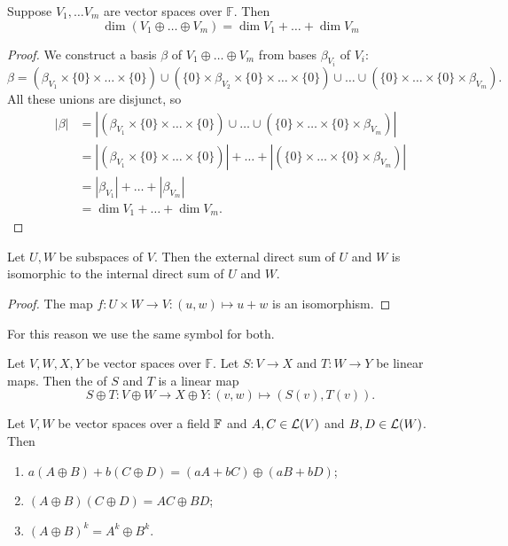 \begin{proposition}
Suppose $V_1, \ldots V_m$ are vector spaces over $\mathbb{F}$. Then
\[ \dim(V_1\oplus\ldots \oplus V_m) = \dim V_1 + \ldots + \dim V_m \]
\label{dimDirectSum}
\end{proposition}
\begin{proof}
We construct a basis $\beta$ of $V_1\oplus\ldots \oplus V_m$ from bases $\beta_{V_i}$ of $V_i$:
\[ \beta = (\beta_{V_1} \times \{0 \} \times \ldots \times \{0 \}) \cup (\{0 \} \times \beta_{V_2}\times \{0 \} \times \ldots \times \{0 \}) \cup \ldots \cup (\{0 \}\times \ldots \times \{0 \} \times \beta_{V_m}). \]
All these unions are disjunct, so
\begin{align*}
|\beta| &= |(\beta_{V_1} \times \{0 \} \times \ldots \times \{0 \}) \cup  \ldots \cup (\{0 \}\times \ldots \times \{0 \} \times \beta_{V_m})| \\
&= |(\beta_{V_1} \times \{0 \} \times \ldots \times \{0 \})| + \ldots + |(\{0 \}\times \ldots \times \{0 \} \times \beta_{V_m})| \\
&= | \beta_{V_1}| + \ldots + |\beta_{V_m}| \\
&= \dim V_1 + \ldots + \dim V_m.
\end{align*}
\end{proof}

\begin{proposition}
Let $U,W$ be subspaces of $V$. Then the external direct sum of $U$ and $W$ is isomorphic to the internal direct sum of $U$ and $W$.
\end{proposition}
\begin{proof}
The map $f: U\times W\to V: (u,w) \mapsto u+w$ is an isomorphism.
\end{proof}
For this reason we use the same symbol for both.

\begin{definition}
Let $V,W, X,Y$ be vector spaces over $\mathbb{F}$. Let $S: V\to X$ and $T: W\to Y$ be linear maps. Then the  of $S$ and $T$ is a linear map
\[ S\oplus T: V \oplus W \to X\oplus Y: (v,w) \mapsto (S(v), T(v)). \]
\end{definition}

\begin{lemma}
Let $V,W$ be vector spaces over a field $\mathbb{F}$ and $A,C\in\operatorname{\mathcal{L}}(V)$ and $B,D\in\operatorname{\mathcal{L}}(W)$. Then
\begin{enumerate}
\item $a(A\oplus B) + b(C\oplus D) = (aA+bC)\oplus (aB + bD)$;
\item $(A\oplus B)(C\oplus D) = AC\oplus BD$;
\item $(A\oplus B)^k = A^k\oplus B^k$.
\end{enumerate}
\end{lemma}

